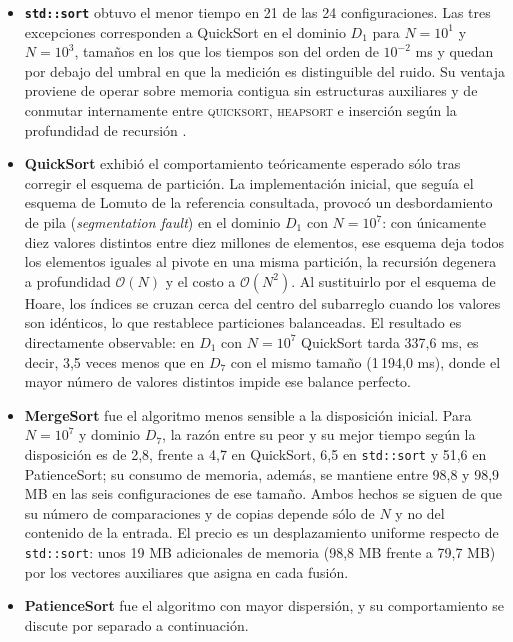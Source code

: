 \begin{itemize}
    \item \textbf{\texttt{std::sort}} obtuvo el menor tiempo en 21 de las 24 configuraciones. Las tres excepciones corresponden a QuickSort en el dominio $D_{1}$ para $N = 10^{1}$ y $N = 10^{3}$, tamaños en los que los tiempos son del orden de $10^{-2}$ ms y quedan por debajo del umbral en que la medición es distinguible del ruido. Su ventaja proviene de operar sobre memoria contigua sin estructuras auxiliares y de conmutar internamente entre \textsc{quicksort}, \textsc{heapsort} e inserción según la profundidad de recursión \cite{cppref_sort}.

    \item \textbf{QuickSort} exhibió el comportamiento teóricamente esperado sólo tras corregir el esquema de partición. La implementación inicial, que seguía el esquema de Lomuto de la referencia consultada, provocó un desbordamiento de pila (\emph{segmentation fault}) en el dominio $D_{1}$ con $N = 10^{7}$: con únicamente diez valores distintos entre diez millones de elementos, ese esquema deja todos los elementos iguales al pivote en una misma partición, la recursión degenera a profundidad $\mathcal{O}(N)$ y el costo a $\mathcal{O}(N^{2})$. Al sustituirlo por el esquema de Hoare, los índices se cruzan cerca del centro del subarreglo cuando los valores son idénticos, lo que restablece particiones balanceadas. El resultado es directamente observable: en $D_{1}$ con $N = 10^{7}$ QuickSort tarda 337{,}6 ms, es decir, 3{,}5 veces menos que en $D_{7}$ con el mismo tamaño (1\,194{,}0 ms), donde el mayor número de valores distintos impide ese balance perfecto.

    \item \textbf{MergeSort} fue el algoritmo menos sensible a la disposición inicial. Para $N = 10^{7}$ y dominio $D_{7}$, la razón entre su peor y su mejor tiempo según la disposición es de 2{,}8, frente a 4{,}7 en QuickSort, 6{,}5 en \texttt{std::sort} y 51{,}6 en PatienceSort; su consumo de memoria, además, se mantiene entre 98{,}8 y 98{,}9 MB en las seis configuraciones de ese tamaño. Ambos hechos se siguen de que su número de comparaciones y de copias depende sólo de $N$ y no del contenido de la entrada. El precio es un desplazamiento uniforme respecto de \texttt{std::sort}: unos 19 MB adicionales de memoria (98{,}8 MB frente a 79{,}7 MB) por los vectores auxiliares que asigna en cada fusión.

    \item \textbf{PatienceSort} fue el algoritmo con mayor dispersión, y su comportamiento se discute por separado a continuación.
\end{itemize}


